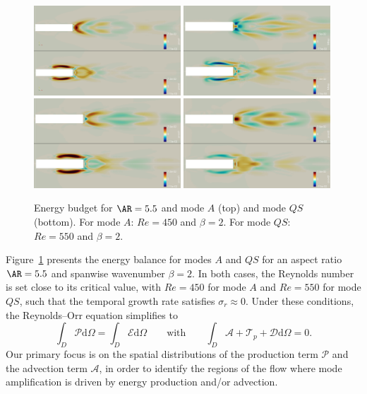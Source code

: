 \begin{figure}
  \centering
  \includegraphics[width=0.49\textwidth]{./fig/AR5p5/Prod_Re450_Re550_beta2.png}
  \includegraphics[width=0.49\textwidth]{./fig/AR5p5/Mtrsp_Re450_Re550_beta2.png}
  \includegraphics[width=0.49\textwidth]{./fig/AR5p5/Prod1_Re450_Re550_beta2.png}
  \includegraphics[width=0.49\textwidth]{./fig/AR5p5/Prod2_Re450_Re550_beta2.png}
  \caption{Energy budget for $\AR=5.5$ and mode $A$ (top) and mode $QS$ (bottom). For mode $A$: $Re=450$ and $\beta=2$. For mode $QS$: $Re=550$ and $\beta=2$.}
  \label{fig:ener_budget}
\end{figure}
%
Figure~\ref{fig:ener_budget} presents the energy balance for modes $A$ and $QS$ for an aspect ratio $\AR = 5.5$ and spanwise wavenumber $\beta = 2$. In both cases, the Reynolds number is set close to its critical value, with $Re = 450$ for mode $A$ and $Re = 550$ for mode $QS$, such that the temporal growth rate satisfies $\sigma_r \approx 0$. Under these conditions, the Reynolds–Orr equation simplifies to
\begin{equation*}
 \int_{D} \mathcal{P} \text{d}\Omega = \int_{D} \mathcal{E} \text{d}\Omega \qquad \text{with} \qquad
 \int_{D} \mathcal{A} + \mathcal{T}_p + \mathcal{D} \text{d}\Omega = 0.
\end{equation*} 
%
Our primary focus is on the spatial distributions of the production term $\mathcal{P}$ and the advection term $\mathcal{A}$, in order to identify the regions of the flow where mode amplification is driven by energy production and/or advection.

